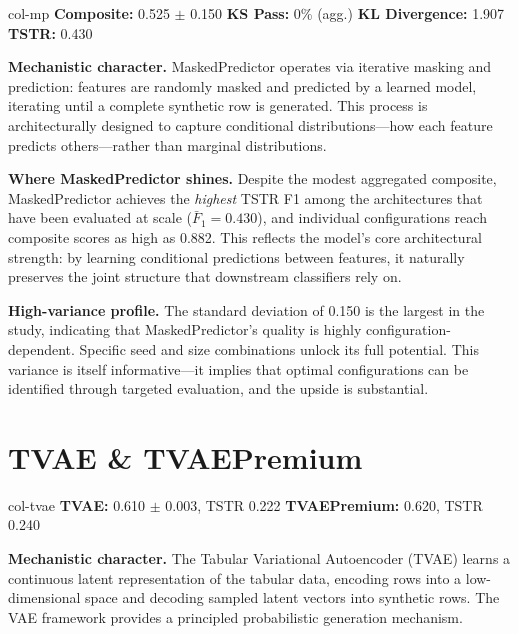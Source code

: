 \documentclass[11pt, a4paper]{report}
\begin{document}
\begin{modelbox}[title={\textbf{MaskedPredictor} --- 17 configurations, 3 seeds $\times$ 4 sizes + 5 additional}]{col-mp}
\textbf{Composite:} 0.525 $\pm$ 0.150 \quad \textbf{KS Pass:} 0\% (agg.) \quad \textbf{KL Divergence:} 1.907 \quad \textbf{TSTR:} 0.430
\end{modelbox}

\textbf{Mechanistic character.} MaskedPredictor operates via iterative masking and prediction: features are randomly masked and predicted by a learned model, iterating until a complete synthetic row is generated. This process is architecturally designed to capture conditional distributions---how each feature predicts others---rather than marginal distributions.

\textbf{Where MaskedPredictor shines.} Despite the modest aggregated composite, MaskedPredictor achieves the \emph{highest} TSTR F1 among the architectures that have been evaluated at scale ($\bar{F}_1 = 0.430$), and individual configurations reach composite scores as high as 0.882. This reflects the model's core architectural strength: by learning conditional predictions between features, it naturally preserves the joint structure that downstream classifiers rely on.

\textbf{High-variance profile.} The standard deviation of 0.150 is the largest in the study, indicating that MaskedPredictor's quality is highly configuration-dependent. Specific seed and size combinations unlock its full potential. This variance is itself informative---it implies that optimal configurations can be identified through targeted evaluation, and the upside is substantial.

\section{\textcolor{col-tvae}{TVAE \& TVAEPremium}}

\begin{modelbox}[title={\textbf{TVAE} --- 5 configs \quad \textbf{TVAEPremium} --- 1 config}]{col-tvae}
\textbf{TVAE:} 0.610 $\pm$ 0.003, TSTR 0.222 \quad
\textbf{TVAEPremium:} 0.620, TSTR 0.240
\end{modelbox}

\textbf{Mechanistic character.} The Tabular Variational Autoencoder (TVAE) learns a continuous latent representation of the tabular data, encoding rows into a low-dimensional space and decoding sampled latent vectors into synthetic rows. The VAE framework provides a principled probabilistic generation mechanism.
\end{document}
